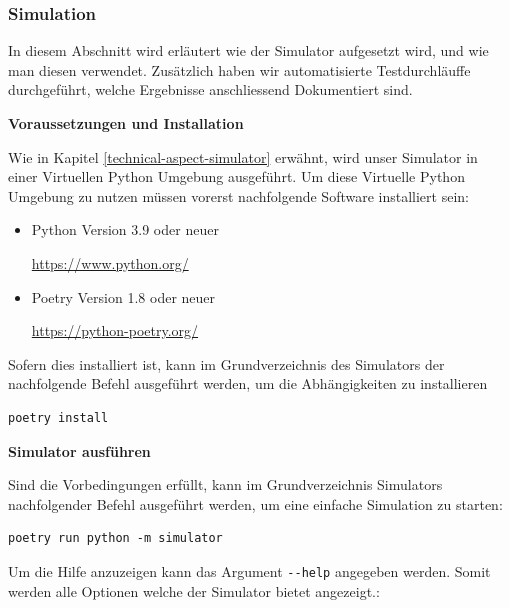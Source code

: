 \subsubsection{Simulation}

In diesem Abschnitt wird erläutert wie der Simulator aufgesetzt wird, und wie man diesen verwendet. Zusätzlich haben wir automatisierte Testdurchläuffe durchgeführt, welche Ergebnisse anschliessend Dokumentiert sind.

\textbf{Voraussetzungen und Installation}

Wie in Kapitel \ref{technical-aspect-simulator} erwähnt, wird unser Simulator in einer Virtuellen Python Umgebung ausgeführt. Um diese Virtuelle Python Umgebung zu nutzen müssen vorerst nachfolgende Software installiert sein:

\begin{itemize}
    \item Python Version 3.9 oder neuer
    
    \url{https://www.python.org/}
    \item Poetry Version 1.8 oder neuer
    
    \url{https://python-poetry.org/}
\end{itemize}

Sofern dies installiert ist, kann im Grundverzeichnis des Simulators der nachfolgende Befehl ausgeführt werden, um die Abhängigkeiten zu installieren

\begin{verbatim}
poetry install
\end{verbatim}

\textbf{Simulator ausführen}

Sind die Vorbedingungen erfüllt, kann im Grundverzeichnis Simulators nachfolgender Befehl ausgeführt werden, um eine einfache Simulation zu starten:

\begin{verbatim}
poetry run python -m simulator
\end{verbatim}

Um die Hilfe anzuzeigen kann das Argument \verb|--help| angegeben werden. Somit werden alle Optionen welche der Simulator bietet angezeigt.:


